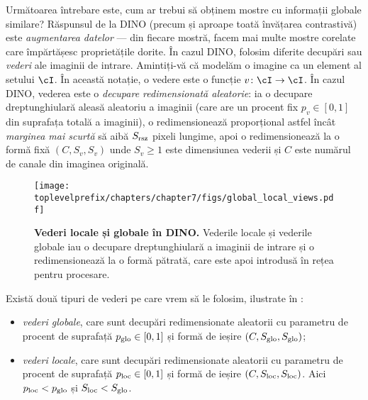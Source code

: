 \documentclass[../../book-main_ro.tex]{subfiles}
\begin{document}
Următoarea întrebare este, cum ar trebui să obținem mostre cu informații globale similare? Răspunsul de la DINO (precum și aproape toată învățarea contrastivă) este \textit{augmentarea datelor} --- din fiecare mostră, facem mai multe mostre corelate care împărtășesc proprietățile dorite. În cazul DINO, folosim diferite decupări sau \textit{vederi} ale imaginii de intrare. Amintiți-vă că modelăm o imagine ca un element al setului \(\cI\). În această notație, o vedere este o funcție \(v \colon \cI \to \cI\). În cazul DINO, vederea este o \textit{decupare redimensionată aleatorie}: ia o decupare dreptunghiulară aleasă aleatoriu a imaginii (care are un procent fix \(p_{v} \in [0, 1]\) din suprafața totală a imaginii), o redimensionează proporțional astfel încât \textit{marginea mai scurtă} să aibă \(S_{\mathrm{rsz}}\) pixeli lungime, apoi o redimensionează la o formă fixă \((C, S_{v}, S_{v})\) unde \(S_{v} \geq 1\) este dimensiunea vederii și \(C\) este numărul de canale din imaginea originală.

\begin{figure}
    \centering 
    \texttt{[image: \\toplevelprefix/chapters/chapter7/figs/global\_local\_views.pdf]}
    \caption{\textbf{Vederi locale și globale în DINO.} Vederile locale și vederile globale iau o decupare dreptunghiulară a imaginii de intrare și o redimensionează la o formă pătrată, care este apoi introdusă în rețea pentru procesare.}
    \label{fig:dino_local_global_views}
\end{figure}

Există două tipuri de vederi pe care vrem să le folosim, ilustrate în : 
\begin{itemize}
    \item \textit{vederi globale}, care sunt decupări redimensionate aleatorii cu parametru de procent de suprafață \(p_{\mathrm{glo}} \in [0, 1]\) și formă de ieșire \((C, S_{\mathrm{glo}}, S_{\mathrm{glo}})\);
    \item \textit{vederi locale}, care sunt decupări redimensionate aleatorii cu parametru de procent de suprafață \(p_{\mathrm{loc}} \in [0, 1]\) și formă de ieșire \((C, S_{\mathrm{loc}}, S_{\mathrm{loc}})\). Aici \(p_{\mathrm{loc}} < p_{\mathrm{glo}}\) și \(S_{\mathrm{loc}} < S_{\mathrm{glo}}\).
\end{itemize}
\end{document}

